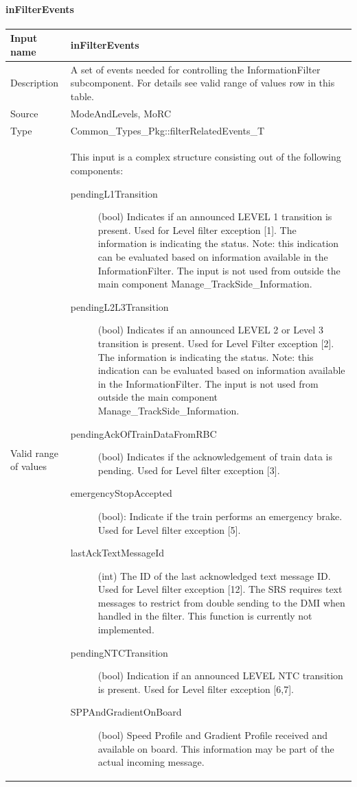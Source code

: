 \paragraph{inFilterEvents}

\begin{longtable}{p{}p{}}
\toprule
Input name			& inFilterEvents \\
\midrule
Description			& A set of events needed for controlling the InformationFilter subcomponent. For details see valid range of values row in this table.\\
\midrule
Source				& ModeAndLevels, MoRC
\\  
\midrule
Type					& Common\_Types\_Pkg::filterRelatedEvents\_T\\
\midrule
Valid range of values	& This input is a complex structure consisting out of the following components:
\begin{description}
\item[pendingL1Transition](bool) Indicates if an announced LEVEL 1 transition is present. Used for Level filter exception [1]. The information is indicating the status.
Note: this indication can be evaluated based on information available in the InformationFilter. The input is not used from outside the main component Manage\_TrackSide\_Information.
\item[pendingL2L3Transition](bool) Indicates if an announced LEVEL 2 or Level 3 transition is present. Used for Level Filter exception [2]. The information is indicating the status.
Note: this indication can be evaluated based on information available in the InformationFilter. The input is not used from outside the main component Manage\_TrackSide\_Information.
\item[pendingAckOfTrainDataFromRBC](bool) Indicates if the acknowledgement of train data is pending. Used for Level filter exception [3].
\item[emergencyStopAccepted](bool): Indicate if the train performs an emergency brake. Used for Level filter exception [5].
\item[lastAckTextMessageId](int) The ID of the last acknowledged text message ID. Used for Level filter exception [12]. The SRS requires text messages to restrict from double sending to the DMI when handled in the filter. This function is currently not implemented. 
\item[pendingNTCTransition](bool) Indication if an announced LEVEL NTC transition is present. Used for Level filter exception [6,7].
\item[SPPAndGradientOnBoard](bool) Speed Profile and Gradient Profile received and available on board. This information may be part of the actual incoming message.

\end{description}
\end{longtable}
